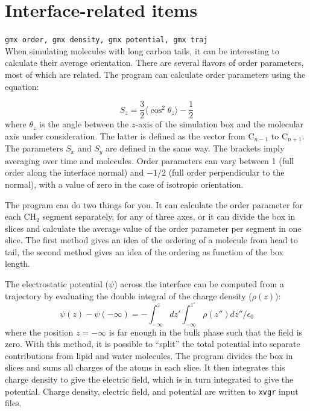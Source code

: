 
\section{Interface-related items}
{\tt gmx order, gmx density, gmx potential, gmx traj}\\
When simulating molecules with long carbon tails, it can be
interesting to calculate their average orientation. There are several
flavors of order parameters, most of which are related. The program
{\tt {}} can calculate order parameters using the equation:

\begin{equation}
S_{z} = \frac{3}{2}\langle {\cos^2{\theta_z}} \rangle - \frac{1}{2}
\label{eqn:Sgr}
\end{equation}
where $\theta_z$ is the angle between the $z$-axis of the simulation
box and the molecular axis under consideration. The latter is defined as the
vector from C$_{n-1}$ to C$_{n+1}$. The parameters $S_x$
and $S_y$ are defined in the same way. The brackets imply averaging over time
and molecules. Order parameters can vary between 1 (full order along
the interface normal) and $-1/2$ (full order perpendicular to the
normal), with a value of zero in the case of isotropic orientation.

The program can do two things for you. It can calculate the order
parameter for each CH$_2$ segment separately, for any of three axes,
or it can divide the box in slices and calculate the average value of
the order parameter per segment in one slice. The first method gives
an idea of the ordering of a molecule from head to tail, the second
method gives an idea of the ordering as function of the box length.

The electrostatic potential ($\psi$) across the interface can be
computed from a trajectory by evaluating the double integral of the
charge density ($\rho(z)$):
\begin{equation}
\psi(z) - \psi(-\infty) = - \int_{-\infty}^z dz' \int_{-\infty}^{z'} \rho(z'')dz''/ \epsilon_0 
\label{eqn:elpotgr}
\end{equation}
where the position $z=-\infty$ is far enough in the bulk phase such that
the field is zero.  With this method, it is possible to ``split'' the
total potential into separate contributions from lipid and water
molecules. The program {\tt {}} divides the box in slices and
sums all charges of the atoms in each slice. It then integrates this
charge density to give the electric field, which is in turn integrated to
give the potential. Charge density, electric field, and potential are written
to {\tt xvgr} input files.

